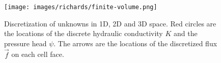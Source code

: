 \begin{figure}[ht]
\begin{center}
\texttt{[image: images/richards/finite-volume.png]}
\end{center}
\caption{Discretization of unknowns in 1D, 2D and 3D space. Red circles are the locations of the discrete hydraulic conductivity $K$ and the pressure head $\psi$.
The arrows are the locations of the discretized flux $\vec f$ on each cell face.}
\label{fig:richards-finite-volume}
\end{figure}
